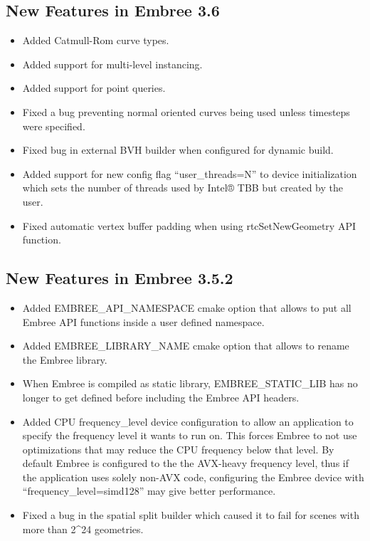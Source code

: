 \subsection{New Features in Embree
3.6}\label{new-features-in-embree-3.6}

\begin{itemize}
\tightlist
\item
  Added Catmull-Rom curve types.
\item
  Added support for multi-level instancing.
\item
  Added support for point queries.
\item
  Fixed a bug preventing normal oriented curves being used unless
  timesteps were specified.
\item
  Fixed bug in external BVH builder when configured for dynamic build.
\item
  Added support for new config flag ``user\_threads=N'' to device
  initialization which sets the number of threads used by Intel® TBB but
  created by the user.
\item
  Fixed automatic vertex buffer padding when using rtcSetNewGeometry API
  function.
\end{itemize}

\subsection{New Features in Embree
3.5.2}\label{new-features-in-embree-3.5.2}

\begin{itemize}
\tightlist
\item
  Added EMBREE\_API\_NAMESPACE cmake option that allows to put all
  Embree API functions inside a user defined namespace.
\item
  Added EMBREE\_LIBRARY\_NAME cmake option that allows to rename the
  Embree library.
\item
  When Embree is compiled as static library, EMBREE\_STATIC\_LIB has no
  longer to get defined before including the Embree API headers.
\item
  Added CPU frequency\_level device configuration to allow an
  application to specify the frequency level it wants to run on. This
  forces Embree to not use optimizations that may reduce the CPU
  frequency below that level. By default Embree is configured to the the
  AVX-heavy frequency level, thus if the application uses solely non-AVX
  code, configuring the Embree device with ``frequency\_level=simd128''
  may give better performance.
\item
  Fixed a bug in the spatial split builder which caused it to fail for
  scenes with more than 2\^{}24 geometries.
\end{itemize}

